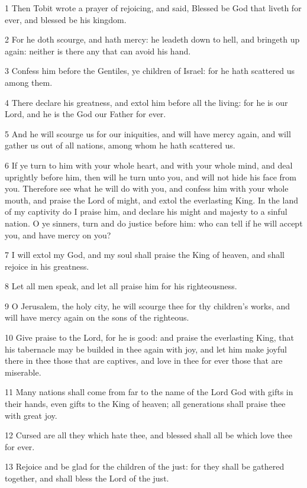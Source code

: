 \par 1 Then Tobit wrote a prayer of rejoicing, and said, Blessed be God that liveth for ever, and blessed be his kingdom.
\par 2 For he doth scourge, and hath mercy: he leadeth down to hell, and bringeth up again: neither is there any that can avoid his hand.
\par 3 Confess him before the Gentiles, ye children of Israel: for he hath scattered us among them.
\par 4 There declare his greatness, and extol him before all the living: for he is our Lord, and he is the God our Father for ever.
\par 5 And he will scourge us for our iniquities, and will have mercy again, and will gather us out of all nations, among whom he hath scattered us.
\par 6 If ye turn to him with your whole heart, and with your whole mind, and deal uprightly before him, then will he turn unto you, and will not hide his face from you. Therefore see what he will do with you, and confess him with your whole mouth, and praise the Lord of might, and extol the everlasting King. In the land of my captivity do I praise him, and declare his might and majesty to a sinful nation. O ye sinners, turn and do justice before him: who can tell if he will accept you, and have mercy on you?
\par 7 I will extol my God, and my soul shall praise the King of heaven, and shall rejoice in his greatness.
\par 8 Let all men speak, and let all praise him for his righteousness.
\par 9 O Jerusalem, the holy city, he will scourge thee for thy children's works, and will have mercy again on the sons of the righteous.
\par 10 Give praise to the Lord, for he is good: and praise the everlasting King, that his tabernacle may be builded in thee again with joy, and let him make joyful there in thee those that are captives, and love in thee for ever those that are miserable.
\par 11 Many nations shall come from far to the name of the Lord God with gifts in their hands, even gifts to the King of heaven; all generations shall praise thee with great joy.
\par 12 Cursed are all they which hate thee, and blessed shall all be which love thee for ever.
\par 13 Rejoice and be glad for the children of the just: for they shall be gathered together, and shall bless the Lord of the just.
